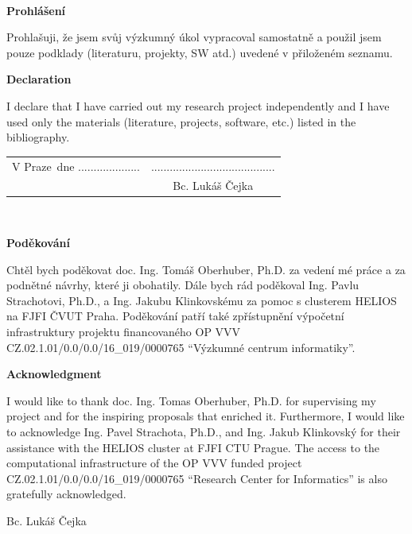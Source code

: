 \documentclass[11pt,twoside,czech,american]{book}
\newcommand{\tb}{\textbf} 								  %
\newcommand{\paperAuthor}{Bc. Lukáš Čejka}   				 %
\newcommand{\place}{Praze} 									 %
\newcommand{\declarationCZ}{Prohlašuji, že jsem svůj výzkumný úkol vypracoval samostatně a použil jsem pouze podklady (literaturu, projekty, SW atd.) uvedené v přiloženém seznamu.}
\newcommand{\declarationEN}{I declare that I have carried out my research project independently and I have used only the materials (literature, projects, software, etc.) listed in the bibliography.}
\newcommand{\acknowledgementCZ}{Chtěl bych poděkovat doc. Ing. Tomáš Oberhuber, Ph.D. za vedení mé práce a za podnětné návrhy, které ji obohatily. Dále bych rád poděkoval Ing. Pavlu Strachotovi, Ph.D., a Ing. Jakubu Klinkovskému za pomoc s clusterem HELIOS na FJFI ČVUT Praha. Poděkování patří také zpřístupnění výpočetní infrastruktury projektu financovaného OP VVV CZ.02.1.01/0.0/0.0/16\_019/0000765 ``Výzkumné centrum informatiky''.}
\newcommand{\acknowledgementEN}{I would like to thank doc. Ing. Tomas Oberhuber, Ph.D. for supervising my project and for the inspiring proposals that enriched it. Furthermore, I would like to acknowledge Ing. Pavel Strachota, Ph.D., and Ing. Jakub Klinkovský for their assistance with the HELIOS cluster at FJFI CTU Prague. The access to the computational infrastructure of the OP VVV funded project CZ.02.1.01/0.0/0.0/16\_019/0000765 ``Research Center for Informatics'' is also gratefully acknowledged.}
\begin{document}
\newpage 			  %
\thispagestyle{empty} %

~ 					  %
\vfill 				  %

\tb{Prohlášení} 	  %

\vspace{1em} 		  %
\declarationCZ

%
\vspace{1em}
\tb{Declaration}

\vspace{1em}
\declarationEN
{}%

\vspace{2em}  									 							  %
\hspace{-0.5em}\begin{tabularx}{\textwidth}{X c} 							  %
V \place\ dne .................... &........................................ \\ %
	& \paperAuthor
\end{tabularx} %




\newpage
\thispagestyle{empty}

~
\vfill %

\tb{Poděkování}

\vspace{1em} %
\acknowledgementCZ

%
\vspace{1em}
\tb{Acknowledgment}

%
\vspace{1em} %
\acknowledgementEN
\begin{flushright}
\paperAuthor
\end{flushright}  %




\newpage   			  %
\thispagestyle{empty} %

\newbox\odstavecbox
\newlength\vyskaodstavce
\newcommand\odstavec[2]{%
    \setbox\odstavecbox=\hbox{%
         \parbox[t]{#1}{#2\vrule width 0pt depth 4pt}}%
    \global\vyskaodstavce=\dp\odstavecbox
    \box\odstavecbox}
\newcommand{\delka}{120mm} %
\end{document}
